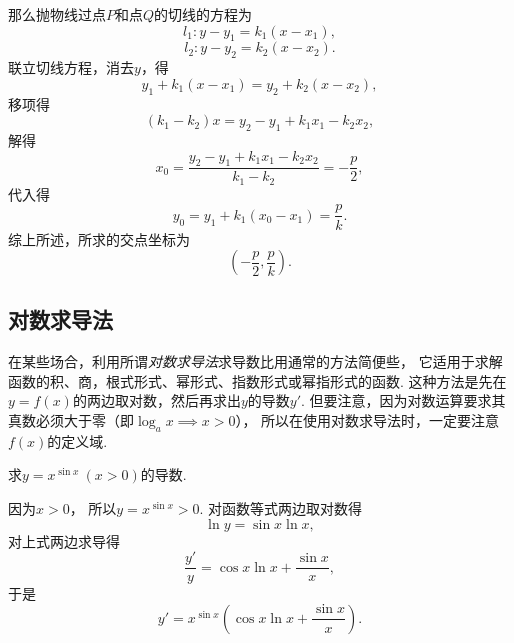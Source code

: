 \begin{example}
\begin{solution}
那么抛物线过点\(P\)和点\(Q\)的切线的方程为\begin{equation*}
	l_1: y-y_1 = k_1 (x-x_1),
\end{equation*}\begin{equation*}
	l_2: y-y_2 = k_2 (x-x_2).
\end{equation*}
联立切线方程，消去\(y\)，得\begin{equation*}
	y_1 + k_1(x - x_1) = y_2 + k_2(x - x_2),
\end{equation*}
移项得\begin{equation*}
	(k_1 - k_2) x = y_2 - y_1 + k_1 x_1 - k_2 x_2,
\end{equation*}
解得\begin{equation*}
	x_0 = \frac{y_2 - y_1 + k_1 x_1 - k_2 x_2}{k_1 - k_2}
	= -\frac{p}{2},
\end{equation*}
代入得\begin{equation*}
	y_0 = y_1 + k_1(x_0 - x_1)
	= \frac{p}{k}.
\end{equation*}
综上所述，所求的交点坐标为\begin{equation*}
	\left(-\frac{p}{2},\frac{p}{k}\right).
\end{equation*}
\end{solution}
\end{example}

\subsection{对数求导法}
在某些场合，利用所谓\emph{对数求导法}求导数比用通常的方法简便些，
它适用于求解函数的积、商，根式形式、幂形式、指数形式或幂指形式的函数.
这种方法是先在\(y=f(x)\)的两边取对数，然后再求出\(y\)的导数\(y'\).
但要注意，因为对数运算要求其真数必须大于零（即\(\log_a x \implies x>0\)），
所以在使用对数求导法时，一定要注意\(f(x)\)的定义域.

\begin{example}
求\(y=x^{\sin x}\ (x>0)\)的导数.
\begin{solution}
因为\(x > 0\)，
所以\(y=x^{\sin x} > 0\).
对函数等式两边取对数得\begin{equation*}
	\ln y = \sin x \ln x,
\end{equation*}
对上式两边求导得\begin{equation*}
	\frac{y'}{y} = \cos x \ln x + \frac{\sin x}{x},
\end{equation*}
于是\begin{equation*}
	y' = x^{\sin x} \left( \cos x \ln x + \frac{\sin x}{x} \right).
\end{equation*}
\end{solution}
\end{example}

